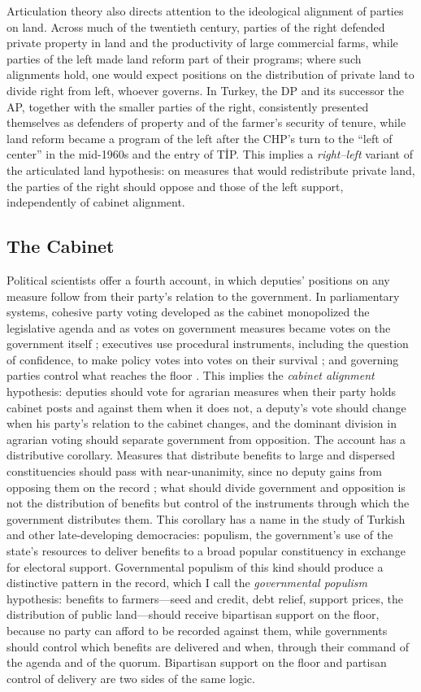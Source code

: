 \documentclass[12pt]{article}
\begin{document}
Articulation theory also directs attention to the ideological alignment of parties on land. Across much of the twentieth century, parties of the right defended private property in land and the productivity of large commercial farms, while parties of the left made land reform part of their programs; where such alignments hold, one would expect positions on the distribution of private land to divide right from left, whoever governs. In Turkey, the DP and its successor the AP, together with the smaller parties of the right, consistently presented themselves as defenders of property and of the farmer's security of tenure, while land reform became a program of the left after the CHP's turn to the ``left of center'' in the mid-1960s and the entry of TİP. This implies a \textit{right--left} variant of the articulated land hypothesis: on measures that would redistribute private land, the parties of the right should oppose and those of the left support, independently of cabinet alignment.

\subsection*{The Cabinet}

Political scientists offer a fourth account, in which deputies' positions on any measure follow from their party's relation to the government. In parliamentary systems, cohesive party voting developed as the cabinet monopolized the legislative agenda and as votes on government measures became votes on the government itself \citep{cox1987}; executives use procedural instruments, including the question of confidence, to make policy votes into votes on their survival \citep{huber1996}; and governing parties control what reaches the floor \citep{cox2005}. This implies the \textit{cabinet alignment} hypothesis: deputies should vote for agrarian measures when their party holds cabinet posts and against them when it does not, a deputy's vote should change when his party's relation to the cabinet changes, and the dominant division in agrarian voting should separate government from opposition. The account has a distributive corollary. Measures that distribute benefits to large and dispersed constituencies should pass with near-unanimity, since no deputy gains from opposing them on the record \citep{weingast1979}; what should divide government and opposition is not the distribution of benefits but control of the instruments through which the government distributes them. This corollary has a name in the study of Turkish and other late-developing democracies: populism, the government's use of the state's resources to deliver benefits to a broad popular constituency in exchange for electoral support. Governmental populism of this kind should produce a distinctive pattern in the record, which I call the \textit{governmental populism} hypothesis: benefits to farmers---seed and credit, debt relief, support prices, the distribution of public land---should receive bipartisan support on the floor, because no party can afford to be recorded against them, while governments should control which benefits are delivered and when, through their command of the agenda and of the quorum. Bipartisan support on the floor and partisan control of delivery are two sides of the same logic.
\end{document}
